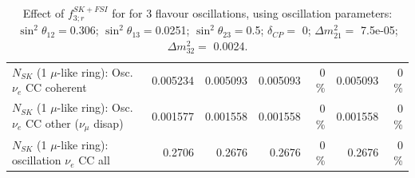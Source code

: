\begin{table}
\begin{tabular}{| l | r | r | r  r | r  r |}
                          $N_{SK}$ (1 $\mu$-like ring): Osc. $\nu_e$ CC coherent &        0.005234 &        0.005093 &        0.005093 &        0 \%  &        0.005093 &        0 \%  \\ 
           $N_{SK}$ (1 $\mu$-like ring): Osc. $\nu_e$ CC other ($\nu_\mu$ disap) &        0.001577 &        0.001558 &        0.001558 &        0 \%  &        0.001558 &        0 \%  \\ 
                        $N_{SK}$ (1 $\mu$-like ring): oscillation $\nu_e$ CC all &          0.2706 &          0.2676 &          0.2676 &        0 \%  &          0.2676 &        0 \%  \\ 
\hline
\hline
\end{tabular}
\caption{ Effect of $f_{3; r}^{SK+FSI}$ for for 3 flavour oscillations, using oscillation parameters:  $\sin^2\theta_{12} = $0.306; $\sin^2\theta_{13} = $0.0251; $\sin^2\theta_{23} = $0.5; $\delta_{CP} = $        0; $\Delta m^2_{21} = $    7.5e-05; $\Delta m^2_{32} = $    0.0024. }
\label{tab:num_skdetfsi_003_1RmuT_3f_osc_t13:0.0251_spectralreco_spectraltrue}
\end{table}
\clearpage
